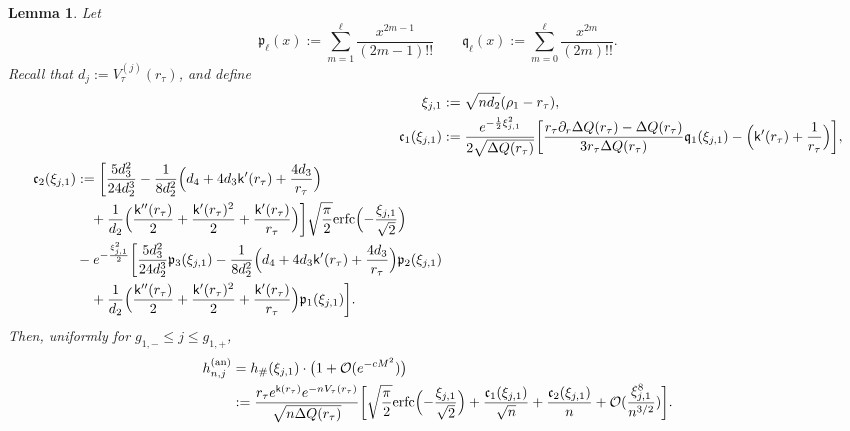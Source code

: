 \documentclass[a4paper]{article}
\newtheorem{lemma}[theorem]{Lemma}
\numberwithin{equation}{section}
\begin{document}
\begin{lemma}\label{lemma:g1- j g1+}
Let
\begin{equation}
\mathfrak{p}_{\ell}(x):=
\sum_{m=1}^{\ell}\frac{x^{2m-1}}{(2m-1)!!}
\qquad
\mathfrak{q}_{\ell}(x):=\sum_{m=0}^{\ell}\frac{x^{2m}}{(2m)!!}.
\end{equation}
Recall that $d_j:=V_{\tau}^{(j)}(r_{\tau})$, and define
\begin{align}
    \xi_{j,1}&:=\sqrt{nd_2}(\rho_1-r_{\tau}), 
    \\
    \mathfrak{c}_1(\xi_{j,1})&:=\frac{e^{-\frac{1}{2}\xi_{j,1}^2}}{2\sqrt{\Delta Q(r_{\tau})}}\biggl[
\frac{r_{\tau}\partial_r\Delta Q(r_{\tau})-\Delta Q(r_{\tau})}{3r_{\tau}\Delta Q(r_{\tau})}\mathfrak{q}_1(\xi_{j,1})-\Bigl( \mathsf{k}'(r_{\tau})+\frac{1}{r_{\tau}}\Bigr)
\bigg],
    \\
    \begin{split}
    \mathfrak{c}_2(\xi_{j,1})&:=\bigg[
\frac{5d_3^2}{24d_2^3}-\frac{1}{8d_2^2}\Bigl(d_4+4d_3\mathsf{k}'(r_{\tau})+\frac{4d_3}{r_{\tau}}\Bigr)
\\
&\quad+\frac{1}{d_2}\Bigl(\frac{\mathsf{k}''(r_{\tau})}{2}+\frac{\mathsf{k}'(r_{\tau})^2}{2}+\frac{\mathsf{k}'(r_{\tau})}{r_{\tau}}\Bigr)
\bigg]\sqrt{\frac{\pi}{2}}\mathrm{erfc}\Bigl(-\frac{\xi_{j,1}}{\sqrt{2}}\Bigr)
\\
&-e^{-\frac{\xi_{j,1}^2}{2}}\bigg[ 
\frac{5d_3^2}{24d_2^3}\mathfrak{p}_{3}(\xi_{j,1})-\frac{1}{8d_2^2}\Bigl(d_4+4d_3\mathsf{k}'(r_{\tau})+\frac{4d_3}{r_{\tau}}\Bigr)\mathfrak{p}_{2}(\xi_{j,1})
\\
&\quad
+\frac{1}{d_2}\Bigl(\frac{\mathsf{k}''(r_{\tau})}{2}+\frac{\mathsf{k}'(r_{\tau})^2}{2}+\frac{\mathsf{k}'(r_{\tau})}{r_{\tau}}\Bigr)\mathfrak{p}_{1}(\xi_{j,1})
\bigg].
    \end{split}
\end{align}
Then, uniformly for $g_{1,-}\leq j\leq g_{1,+}$,
\begin{align}
\begin{split}
h_{n,j}^{(\mathrm{an})}
&=h_{\#}(\xi_{j,1})\cdot\bigl(1+\mathcal{O}(e^{-cM^2})\bigr)
\\
&:=
\frac{r_{\tau}e^{\mathsf{k}(r_{\tau})}e^{-nV_{\tau}(r_{\tau})}}{\sqrt{n\Delta Q(r_{\tau})}}
\bigg[
\sqrt{\frac{\pi}{2}}\mathrm{erfc}\Bigl( -\frac{\xi_{j,1}}{\sqrt{2}}\Bigr)
+\frac{\mathfrak{c}_1(\xi_{j,1})}{\sqrt{n}}+\frac{\mathfrak{c}_2(\xi_{j,1})}{n}+\mathcal{O}(\frac{\xi_{j,1}^8}{n^{3/2}})
\bigg].
\end{split}    
\end{align}

\end{lemma}
\end{document}
